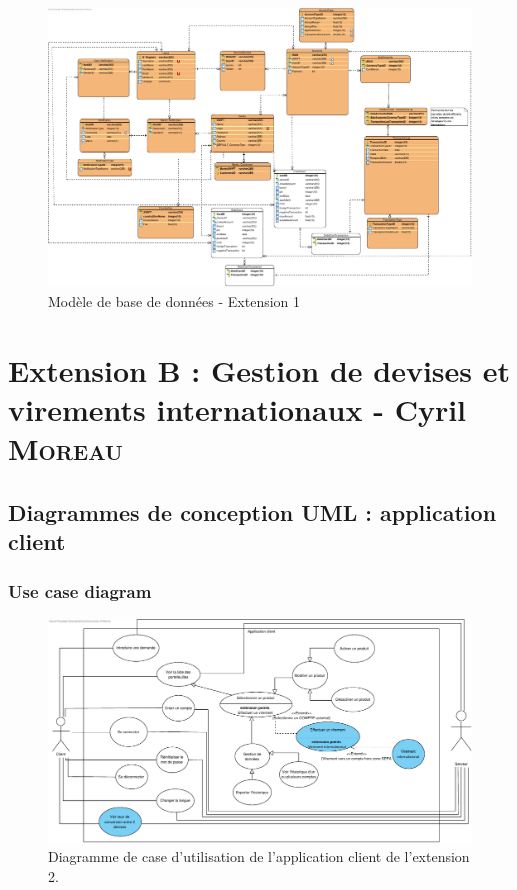 \documentclass[]{report}
\begin{document}
\begin{figure}[h!]
	\centering\includegraphics[width=\linewidth]{img/bdd-extension-1.pdf}
	\caption{Modèle de base de données - Extension 1}
\end{figure}



\newpage




\chapter{Extension B : Gestion de devises et virements internationaux - Cyril \textsc{Moreau}}



\newpage



\section{Diagrammes de conception UML : application client}



\subsection{Use case diagram}

\begin{figure}[h]
	\centering\includegraphics[width=\linewidth]{img/Use Case Client - Extension 2.pdf}
	\caption{Diagramme de case d'utilisation de l'application client de l'extension 2.}
\end{figure}

\newpage
\end{document}
